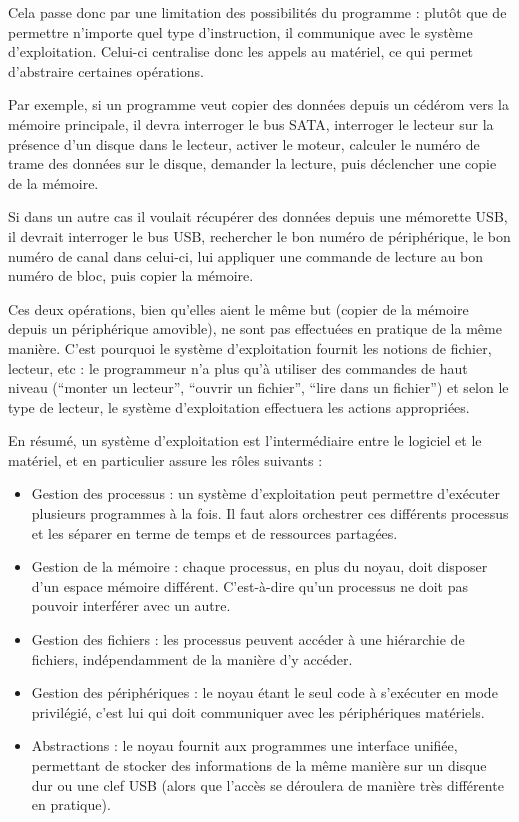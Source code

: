 Cela passe donc par une limitation des possibilités du programme : plutôt que de
permettre n'importe quel type d'instruction, il communique avec le système
d'exploitation. Celui-ci centralise donc les appels au matériel, ce qui permet
d'abstraire certaines opérations.

Par exemple, si un programme veut copier des données depuis un cédérom vers la
mémoire principale, il devra interroger le bus SATA, interroger le lecteur sur
la présence d'un disque dans le lecteur, activer le moteur, calculer le numéro
de trame des données sur le disque, demander la lecture, puis déclencher une
copie de la mémoire.

Si dans un autre cas il voulait récupérer des données depuis une mémorette USB,
il devrait interroger le bus USB, rechercher le bon numéro de périphérique, le
bon numéro de canal dans celui-ci, lui appliquer une commande de lecture au bon
numéro de bloc, puis copier la mémoire.

Ces deux opérations, bien qu'elles aient le même but (copier de la mémoire
depuis un périphérique amovible), ne sont pas effectuées en pratique de la même
manière. C'est pourquoi le système d'exploitation fournit les notions de
fichier, lecteur, etc : le programmeur n'a plus qu'à utiliser des commandes de
haut niveau (``monter un lecteur'', ``ouvrir un fichier'', ``lire dans un
fichier'') et selon le type de lecteur, le système d'exploitation effectuera les
actions appropriées.

En résumé, un système d'exploitation est l'intermédiaire entre le logiciel et
le matériel, et en particulier assure les rôles suivants :

\begin{itemize}
\item
  Gestion des processus : un système d'exploitation peut permettre
  d'exécuter plusieurs programmes à la fois. Il faut alors orchestrer
  ces différents processus et les séparer en terme de temps et de
  ressources partagées.
\item
  Gestion de la mémoire : chaque processus, en plus du noyau, doit
  disposer d'un espace mémoire différent. C'est-à-dire qu'un processus
  ne doit pas pouvoir interférer avec un autre.
\item
  Gestion des fichiers : les processus peuvent accéder à une hiérarchie de
  fichiers, indépendamment de la manière d'y accéder.
\item
  Gestion des périphériques : le noyau étant le seul code à s'exécuter
  en mode privilégié, c'est lui qui doit communiquer avec les
  périphériques matériels.
\item
  Abstractions : le noyau fournit aux programmes une interface unifiée,
  permettant de stocker des informations de la même manière sur un
  disque dur ou une clef USB (alors que l'accès se déroulera de manière
  très différente en pratique).
\end{itemize}

